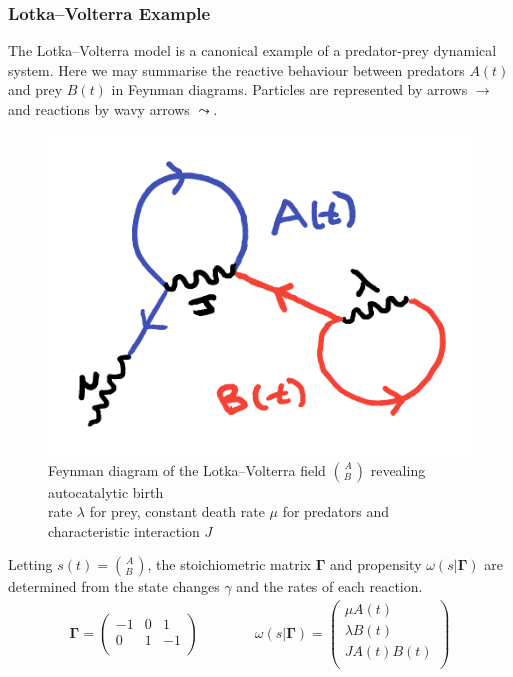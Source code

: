 \documentclass{article}[12pt]
\numberwithin{equation}{section}
\begin{document}
\subsubsection{Lotka--Volterra Example}\vspace{-10pt}
The Lotka--Volterra model is a canonical example of a predator-prey dynamical
system. Here we may summarise the reactive behaviour between predators $A(t)$
and prey $B(t)$ in Feynman diagrams. Particles are represented by arrows
$\rightarrow$ and reactions by wavy arrows $\leadsto$.
\begin{figure}[H]
\centering{}
\captionsetup{justification=centering}
\includegraphics[scale=0.4]{figures/lotkavolterrafield}
\caption{Feynman diagram of the Lotka--Volterra field ${A\choose B\,}$  revealing
autocatalytic birth \\ rate $\lambda$ for prey, constant death rate $\mu$ for predators
and characteristic interaction $J$}
\label{fig:semicircle}
\end{figure}
Letting $s(t)={A\choose B\,}$, the stoichiometric matrix $\mathbf{\Gamma}$ and
propensity $\omega(s|\mathbf{\Gamma})$ are determined from the state changes
$\gamma$ and the rates of each reaction.
\begin{align}
	\mathbf{\Gamma}=
	\begin{pmatrix}
		-1 & 0 & 1 \\
		0 & 1 & -1 \\
	\end{pmatrix}
	\qquad\qquad
	\omega(s|\mathbf{\Gamma})=
	\begin{pmatrix}
	  \mu A(t)\\
		\lambda B(t)  \\
		J A(t)B(t) \\
	\end{pmatrix}
\end{align}
\end{document}
